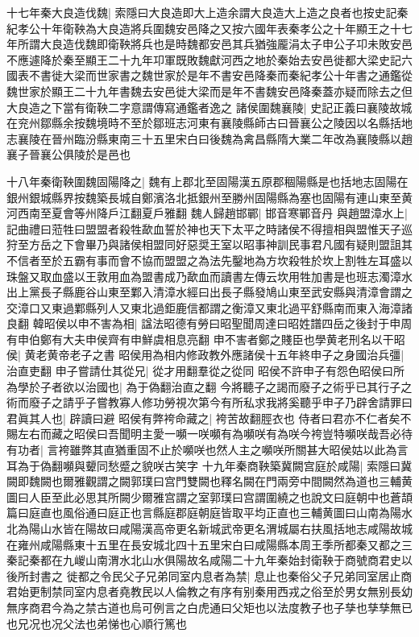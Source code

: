 十七年秦大良造伐魏|{
	索隱曰大良造即大上造余謂大良造大上造之良者也按史記秦紀孝公十年衛鞅為大良造將兵圍魏安邑降之又按六國年表秦孝公之十年顯王之十七年所謂大良造伐魏即衛鞅將兵也是時魏都安邑其兵猶強龎涓太子申公子卭未敗安邑不應遽降於秦至顯王二十九年卭軍既敗魏獻河西之地於秦始去安邑徙都大梁史記六國表不書徙大梁而世家書之魏世家於是年不書安邑降秦而秦紀孝公十年書之通鑑從魏世家於顯王二十九年書魏去安邑徙大梁而是年不書魏安邑降秦蓋亦疑而除去之但大良造之下當有衛鞅二字意謂傳寫通鑑者逸之}
諸侯圍魏襄陵|{
	史記正義曰襄陵故城在兖州鄒縣余按魏境時不至於鄒班志河東有襄陵縣師古曰晉襄公之陵因以名縣括地志襄陵在晉州臨汾縣東南三十五里宋白曰後魏為禽昌縣隋大業二年改為襄陵縣以趙襄子晉襄公俱陵於是邑也}


十八年秦衛鞅圍魏固陽降之|{
	魏有上郡北至固陽漢五原郡稒陽縣是也括地志固陽在銀州銀城縣界按魏築長城自鄭濱洛北抵銀州至勝州固陽縣為塞也固陽有連山東至黄河西南至夏會等州降戶江翻夏戶雅翻}
魏人歸趙邯鄲|{
	邯音寒鄲音丹}
與趙盟漳水上|{
	記曲禮曰蒞牲曰盟盟者殺牲歃血誓於神也天下太平之時諸侯不得擅相與盟惟天子巡狩至方岳之下會畢乃與諸侯相盟同好惡奨王室以昭事神訓民事君凡國有疑則盟詛其不信者至於五霸有事而會不協而盟盟之為法先鑿地為方坎殺牲於坎上割牲左耳盛以珠盤又取血盛以王敦用血為盟書成乃歃血而讀書左傳云坎用牲加書是也班志濁漳水出上黨長子縣鹿谷山東至鄴入清漳水經曰出長子縣發鳩山東至武安縣與清漳會謂之交漳口又東過鄴縣列人又東北過鉅鹿信都謂之衡漳又東北過平舒縣南而東入海漳諸良翻}
韓昭侯以申不害為相|{
	諡法昭德有勞曰昭聖聞周達曰昭姓譜四岳之後封于申周有申伯鄭有大夫申侯齊有申鮮虞相息亮翻}
申不害者鄭之賤臣也學黄老刑名以干昭侯|{
	黄老黄帝老子之書}
昭侯用為相内修政教外應諸侯十五年終申子之身國治兵彊|{
	治直吏翻}
申子嘗請仕其從兄|{
	從才用翻羣從之從同}
昭侯不許申子有怨色昭侯曰所為學於子者欲以治國也|{
	為于偽翻治直之翻}
今將聽子之謁而廢子之術乎已其行子之術而廢子之請乎子嘗教寡人修功勞視次第今有所私求我將奚聽乎申子乃辟舍請罪曰君眞其人也|{
	辟讀曰避}
昭侯有弊袴命藏之|{
	袴苦故翻脛衣也}
侍者曰君亦不仁者矣不賜左右而藏之昭侯曰吾聞明主愛一嚬一咲嚬有為嚬咲有為咲今袴豈特嚬咲哉吾必待有功者|{
	言袴雖弊其直猶重固不止於嚬咲也然人主之嚬咲所關甚大昭侯姑以此為言耳為于偽翻嚬與顰同愁蹙之貌咲古笑字}
十九年秦商鞅築冀闕宫庭於咸陽|{
	索隱曰冀闕即魏闕也爾雅觀謂之闕郭璞曰宫門雙闕也釋名闕在門兩旁中間闕然為道也三輔黄圖曰人臣至此必思其所闕少爾雅宫謂之室郭璞曰宫謂圍繞之也說文曰庭朝中也蒼頡篇曰庭直也風俗通曰庭正也言縣庭郡庭朝庭皆取平均正直也三輔黄圖曰山南為陽水北為陽山水皆在陽故曰咸陽漢高帝更名新城武帝更名渭城屬右扶風括地志咸陽故城在雍州咸陽縣東十五里在長安城北四十五里宋白曰咸陽縣本周王季所都秦又都之三秦記秦都在九嵕山南渭水北山水俱陽故名咸陽二十九年秦始封衛鞅于商號商君史以後所封書之}
徙都之令民父子兄弟同室内息者為禁|{
	息止也秦俗父子兄弟同室居止商君始更制禁同室内息者堯教民以人倫教之有序有别秦用西戎之俗至於男女無别長幼無序商君今為之禁古道也烏可例言之白虎通曰父矩也以法度教子也子孳也孳孳無已也兄况也况父法也弟悌也心順行篤也}

